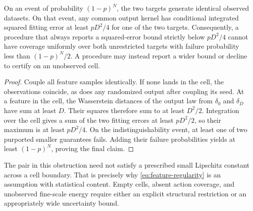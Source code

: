 \begin{proposition}\label{prop:unseen-cell}
On an event of probability $(1-p)^N$, the two targets generate identical observed datasets. On that event, any common output kernel has conditional integrated squared fitting error at least $pD^2/4$ for one of the two targets. Consequently, a procedure that always reports a squared-error bound strictly below $pD^2/4$ cannot have coverage uniformly over both unrestricted targets with failure probability less than $(1-p)^N/2$. A procedure may instead report a wider bound or decline to certify on an unobserved cell.
\end{proposition}
\begin{proof}
Couple all feature samples identically. If none lands in the cell, the observations coincide, as does any randomized output after coupling its seed. At a feature in the cell, the Wasserstein distances of the output law from $\delta_0$ and $\delta_D$ have sum at least $D$. Their squares therefore sum to at least $D^2/2$. Integration over the cell gives a sum of the two fitting errors at least $pD^2/2$, so their maximum is at least $pD^2/4$. On the indistinguishability event, at least one of two purported smaller guarantees fails. Adding their failure probabilities yields at least $(1-p)^N$, proving the final claim.
\end{proof}

The pair in this obstruction need not satisfy a prescribed small Lipschitz constant across a cell boundary. That is precisely why \eqref{eq:feature-regularity} is an assumption with statistical content. Empty cells, absent action coverage, and unobserved fine-scale energy require either an explicit structural restriction or an appropriately wide uncertainty bound.
